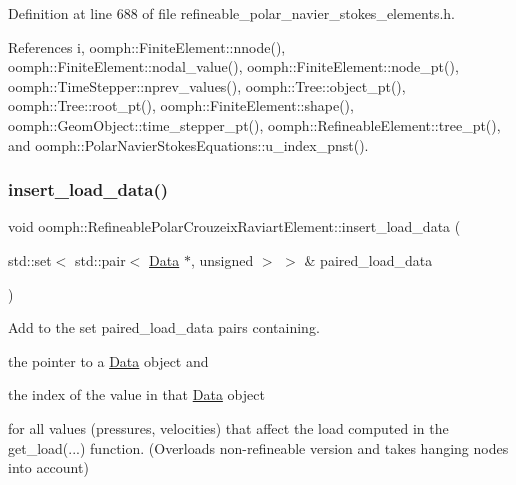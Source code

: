 Definition at line 688 of file refineable\+\_\+polar\+\_\+navier\+\_\+stokes\+\_\+elements.\+h.



References i, oomph\+::\+Finite\+Element\+::nnode(), oomph\+::\+Finite\+Element\+::nodal\+\_\+value(), oomph\+::\+Finite\+Element\+::node\+\_\+pt(), oomph\+::\+Time\+Stepper\+::nprev\+\_\+values(), oomph\+::\+Tree\+::object\+\_\+pt(), oomph\+::\+Tree\+::root\+\_\+pt(), oomph\+::\+Finite\+Element\+::shape(), oomph\+::\+Geom\+Object\+::time\+\_\+stepper\+\_\+pt(), oomph\+::\+Refineable\+Element\+::tree\+\_\+pt(), and oomph\+::\+Polar\+Navier\+Stokes\+Equations\+::u\+\_\+index\+\_\+pnst().

\mbox{\label{classoomph_1_1RefineablePolarCrouzeixRaviartElement_a4e6ef46186c9167549288db230bd4965}} 
\subsubsection{\texorpdfstring{insert\+\_\+load\+\_\+data()}{insert\_load\_data()}}
{\footnotesize\ttfamily void oomph\+::\+Refineable\+Polar\+Crouzeix\+Raviart\+Element\+::insert\+\_\+load\+\_\+data (\begin{DoxyParamCaption}\item[{std\+::set$<$ std\+::pair$<$ \hyperlink{classoomph_1_1Data}{Data} $\ast$, unsigned $>$ $>$ \&}]{paired\+\_\+load\+\_\+data }\end{DoxyParamCaption})\hspace{0.3cm}{\ttfamily [inline]}}



Add to the set {\ttfamily paired\+\_\+load\+\_\+data} pairs containing. 


\begin{DoxyItemize}
\item the pointer to a \hyperlink{classoomph_1_1Data}{Data} object and
\item the index of the value in that \hyperlink{classoomph_1_1Data}{Data} object
\end{DoxyItemize}for all values (pressures, velocities) that affect the load computed in the {\ttfamily get\+\_\+load}(...) function. (Overloads non-\/refineable version and takes hanging nodes into account) 

